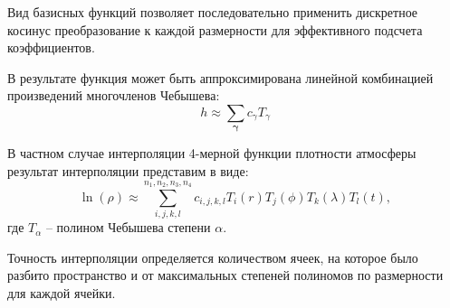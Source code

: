 Вид базисных функций позволяет последовательно
применить дискретное косинус преобразование к каждой размерности для эффективного подсчета
коэффициентов. 

В результате функция может быть аппроксимирована линейной комбинацией произведений
многочленов Чебышева:
\begin{equation*}
    h \approx \sum_{\mathbf{\gamma}} c_{\gamma} T_\gamma
\end{equation*}

В частном случае интерполяции 4-мерной функции плотности атмосферы
результат интерполяции представим в виде:
\begin{equation*}
    \ln(\rho) \approx \sum_{i,j,k,l}^{n_1, n_2, n_3, n_4} 
    c_{i,j,k,l} T_i(r) T_j(\phi) T_k (\lambda) T_l (t),
\end{equation*}
где $T_\alpha$ -- полином Чебышева степени $\alpha$.

Точность интерполяции определяется количеством ячеек, на которое было разбито пространство
и от максимальных степеней полиномов по размерности для каждой ячейки.
\newpage